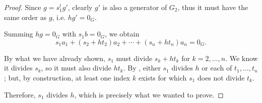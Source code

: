 \begin{proof}
  Since \( g = s_1^l g' \), clearly \( g' \) is also a generator of \( G_2 \), thus it must have the same order as \( g \), i.e. \( h g' = 0_G \).

  Summing \( h g = 0_G \) with \( s_1 b = 0_G \), we obtain
  \begin{equation*}
    s_1 a_1 + (s_2 + h t_2) a_2 + \cdots + (s_n + h t_n) a_n = 0_G.
  \end{equation*}

  By what we have already shown, \( s_1 \) must divide \( s_k + h t_k \) for \( k = 2, \ldots, n \). We know it divides \( s_k \), so it must also divide \( h t_k \). By , either \( s_1 \) divides \( h \) or each of \( t_1, \ldots, t_n \); but, by construction, at least one index \( k \) exists for which \( s_1 \) does not divide \( t_k \).

  Therefore, \( s_1 \) divides \( h \), which is precisely what we wanted to prove.
\end{proof}

